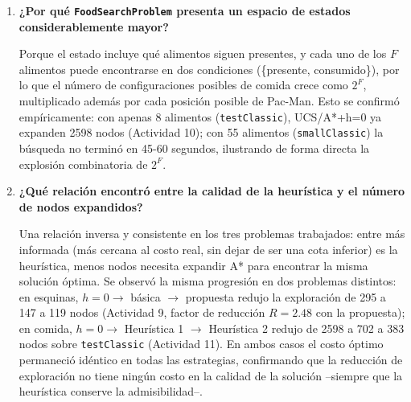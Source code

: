 \begin{enumerate}
\item \textbf{¿Por qué \texttt{FoodSearchProblem} presenta un espacio de estados considerablemente
mayor?}

Porque el estado incluye qué alimentos siguen presentes, y cada uno de los $F$ alimentos puede
encontrarse en dos condiciones (\{presente, consumido\}), por lo que el número de configuraciones
posibles de comida crece como $2^F$, multiplicado además por cada posición posible de Pac-Man. Esto
se confirmó empíricamente: con apenas 8 alimentos (\texttt{testClassic}), UCS/A*+h=0 ya expanden
2598 nodos (Actividad 10); con 55 alimentos (\texttt{smallClassic}) la búsqueda no terminó en 45-60
segundos, ilustrando de forma directa la explosión combinatoria de $2^F$.

\item \textbf{¿Qué relación encontró entre la calidad de la heurística y el número de nodos
expandidos?}

Una relación inversa y consistente en los tres problemas trabajados: entre más informada (más
cercana al costo real, sin dejar de ser una cota inferior) es la heurística, menos nodos necesita
expandir A* para encontrar la misma solución óptima. Se observó la misma progresión en dos
problemas distintos: en esquinas, $h=0 \to$ básica $\to$ propuesta redujo la exploración de 295 a
147 a 119 nodos (Actividad 9, factor de reducción $R=2.48$ con la propuesta); en comida, $h=0 \to$
Heurística 1 $\to$ Heurística 2 redujo de 2598 a 702 a 383 nodos sobre \texttt{testClassic}
(Actividad 11). En ambos casos el costo óptimo permaneció idéntico en todas las estrategias,
confirmando que la reducción de exploración no tiene ningún costo en la calidad de la solución
--siempre que la heurística conserve la admisibilidad--.

\end{enumerate}
